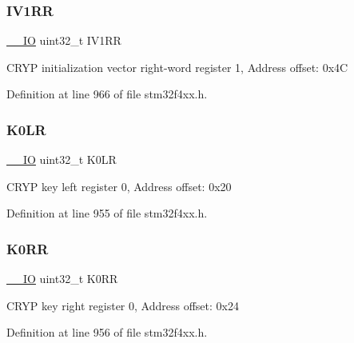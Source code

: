 \subsubsection{\texorpdfstring{I\+V1\+RR}{IV1RR}}
{\footnotesize\ttfamily \hyperlink{group___c_m_s_i_s__core__definitions_gaec43007d9998a0a0e01faede4133d6be}{\+\_\+\+\_\+\+IO} uint32\+\_\+t I\+V1\+RR}

C\+R\+YP initialization vector right-\/word register 1, Address offset\+: 0x4C 

Definition at line 966 of file stm32f4xx.\+h.

\mbox{\label{struct_c_r_y_p___type_def_a3ca109e86323625e5f56f92f999c3b05}} 
\subsubsection{\texorpdfstring{K0\+LR}{K0LR}}
{\footnotesize\ttfamily \hyperlink{group___c_m_s_i_s__core__definitions_gaec43007d9998a0a0e01faede4133d6be}{\+\_\+\+\_\+\+IO} uint32\+\_\+t K0\+LR}

C\+R\+YP key left register 0, Address offset\+: 0x20 

Definition at line 955 of file stm32f4xx.\+h.

\mbox{\label{struct_c_r_y_p___type_def_ae6d97d339f0091d4a105001ea59086ae}} 
\subsubsection{\texorpdfstring{K0\+RR}{K0RR}}
{\footnotesize\ttfamily \hyperlink{group___c_m_s_i_s__core__definitions_gaec43007d9998a0a0e01faede4133d6be}{\+\_\+\+\_\+\+IO} uint32\+\_\+t K0\+RR}

C\+R\+YP key right register 0, Address offset\+: 0x24 

Definition at line 956 of file stm32f4xx.\+h.

\mbox{\label{struct_c_r_y_p___type_def_a948ff2e2e97978287411fe725dd70a7f}} 
